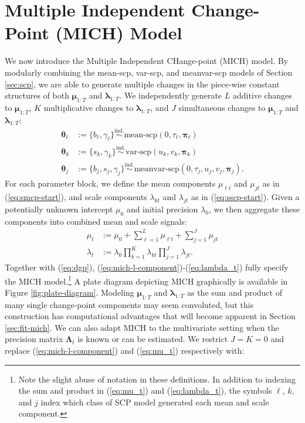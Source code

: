 \section{Multiple Independent Change-Point (MICH) Model}
\label{sec:mich}

We now introduce the Multiple Independent CHange-point (MICH) model. By modularly combining the mean-scp, var-scp, and meanvar-scp models of Section \ref{sec:scp}, we are able to generate multiple changes in the piece-wise constant structures of both $\boldsymbol{\mu}_{1:T}$ and $\boldsymbol{\lambda}_{1:T}$. We independently generate $L$ additive changes to $\boldsymbol{\mu}_{1:T}$, $K$ multiplicative changes to $\boldsymbol{\lambda}_{1:T}$, and $J$ simultaneous changes to $\boldsymbol{\mu}_{1:T}$ and $\boldsymbol{\lambda}_{1:T}$: 
\begin{align}
    \boldsymbol{\theta}_\ell &:= \{b_\ell, \gamma_\ell\} \overset{\text{ind.}}{\sim} \text{mean-scp}(0, \tau_\ell, \boldsymbol{\pi}_{\ell}) \label{eq:mich-l-component} \\
    \boldsymbol{\theta}_k &:= \{s_k, \gamma_k\} \overset{\text{ind.}}{\sim} \text{var-scp}(u_k, v_k, \boldsymbol{\pi}_{k}) \label{eq:mich-k-component} \\
    \boldsymbol{\theta}_j &:= \{b_j, s_j, \gamma_j\} \overset{\text{ind.}}{\sim} \text{meanvar-scp}(0, \tau_j, u_j, v_j, \boldsymbol{\pi}_{j}). \label{eq:mich-j-component}
\end{align}
For each parameter block, we define the mean components $\mu_{\ell t}$ and $\mu_{jt}$ as in (\ref{eq:smcp-start}), and scale components $\lambda_{kt}$ and $\lambda_{jt}$ as in (\ref{eq:sscp-start}). Given a potentially unknown intercept $\mu_0$ and initial precision $\lambda_0$, we then aggregate these components into combined mean and scale signals:
\begin{align}
    \mu_{t} &:= \mu_0 + \sum_{\ell = 1}^L \mu_{\ell t} + \sum_{j = 1}^J \mu_{jt} \label{eq:mu_t}\\
    \lambda_t &:= \lambda_0\prod_{k=1}^K \lambda_{kt}\prod_{j=1}^J \lambda_{jt}. \label{eq:lambda_t}
\end{align}
Together with (\ref{eq:dgp}), (\ref{eq:mich-l-component})-(\ref{eq:lambda_t}) fully specify the MICH model.\footnote{Note the slight abuse of notation in these definitions. In addition to indexing the sum and product in (\ref{eq:mu_t}) and (\ref{eq:lambda_t}), the symbols $\ell$, $k$, and $j$ index which class of SCP model generated each mean and scale component.} A plate diagram depicting MICH graphically is available in Figure \ref{fig:plate-diagram}. Modeling $\boldsymbol{\mu}_{1:T}$ and $\boldsymbol{\lambda}_{1:T}$ as the sum and product of many single change-point components may seem convoluted, but this construction has computational advantages that will become apparent in Section \ref{sec:fit-mich}. We can also adapt MICH to the multivariate setting when the precision matrix $\boldsymbol{\Lambda}_t$ is known or can be estimated. We restrict $J=K=0$ and replace (\ref{eq:mich-l-component}) and (\ref{eq:mu_t}) respectively with:
